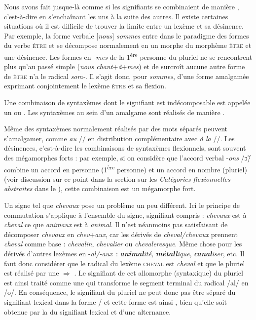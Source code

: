 Nous avons fait jusque-là comme si les signifiants se combinaient de manière , c’est-à-dire en s’enchaînant les uns à la suite des autres. Il existe certaines situations où il est difficile de trouver la limite entre un lexème et sa désinence. Par exemple, la forme verbale [\textit{nous}] \textit{sommes} entre dans le paradigme des formes du verbe \textsc{être} et se décompose normalement en un morphe du morphème \textsc{être} et une désinence. Les formes en \textit{{}-mes} de la 1\textsuperscript{ère} personne du pluriel ne se rencontrent plus qu’au passé simple (\textit{nous chant}+\textit{â}+\textit{mes}) et de surcroît aucune autre forme de \textsc{être} n’a le radical \textit{som-}. Il s’agit donc, pour \textit{sommes}, d’une forme amalgamée exprimant conjointement le lexème \textsc{être} et sa flexion.

{Une combinaison de syntaxèmes dont le signifiant est indécomposable est appelée un  ou . Les syntaxèmes au sein d’un amalgame sont réalisés de manière .}

Même des syntaxèmes normalement réalisés par des mots séparés peuvent s’amalgamer, comme \textit{au} // en distribution complémentaire avec \textit{à la} //. Les désinences, c’est-à-dire les combinaisons de syntaxèmes flexionnels, sont souvent des mégamorphes forts : par exemple, si on considère que l’accord verbal -\textit{ons} /\textstylePhono\~{ɔ}/ combine un accord en personne (1\textsuperscript{ère} personne) et un accord en nombre (pluriel) (voir discussion sur ce point dans la section sur les \textit{Catégories flexionnelles abstraites} dans le ), cette combinaison est un mégamorphe fort.

Un signe tel que \textit{chevaux}  pose un problème un peu différent. Ici le principe de commutation s’applique à l’ensemble du signe, signifiant compris : \textit{chevaux} est à \textit{cheval} ce que \textit{animaux} est à \textit{animal}. Il n’est néanmoins pas satisfaisant de décomposer \textit{chevaux} en \textit{chev}+\textit{aux}, car les dérivés de \textit{cheval/chevaux} prennent \textit{cheval} comme base : \textit{chevalin}, \textit{chevalier} ou \textit{chevaleresque}. Même chose pour les dérivés d’autres lexèmes en -\textit{al/-aux~}: \textbf{\textit{animal}}\textit{ité,} \textbf{\textit{métall}}\textit{ique}, \textbf{\textit{canal}}\textit{iser}, etc. Il faut donc considérer que le radical du lexème \textsc{cheval} est \textit{cheval} et que le pluriel est réalisé par une   ${\Rightarrow}$ . Le signifiant de cet allomorphe (syntaxique) du pluriel est ainsi traité comme une  qui transforme le segment terminal du radical /al/ en /o/. En conséquence, le signifiant du pluriel ne peut donc pas être séparé du signifiant lexical dans la forme / et cette forme est ainsi , bien qu’elle soit obtenue par la  du signifiant lexical et d’une alternance.

